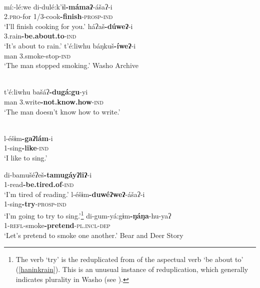 \documentclass[output=paper]{langscibook}
\begin{document}
\label{haninkaspect}\\
\ex mí:-lé:we di-dulé:k'ɨl\textbf{-mámaʔ}-ášaʔ-i\\
2.{\scshape pro}-for 1/3-cook\textbf{-finish}-{\scshape prosp-ind}\\
\glt `I'll finish cooking for you.' 
\ex \gll háʔaš\textbf{-dúweʔ}-i\\
3.rain\textbf{-be.about.to}-{\scshape ind}\\
\glt `It's about to rain.'\label{haninkrain}
\ex \gll\label{haninksmoke} t'é:liwhu báŋkuš\textbf{-íweʔ}-i\\
{} man 3.smoke-stop-{\scshape ind}\\
\glt `The man stopped smoking.' \hfill Washo Archive
\z
\z



 \\
{\gll t'é:liwhu bašáʔ\textbf{-dugá:gu}-yi\\
 man 3.write\textbf{-not.know.how}-{\scshape ind}\\
\glt `The man doesn't know how to write.'} \label{haninkmodal}
\z 


\label{haninkwant}\\
\ex  \gll l-éšɨm\textbf{-gaʔlám}-i\\
1-sing\textbf{-like}-{\scshape ind}\\
\glt `I like to sing.'
\z 
\z 

\label{haninkother} 
\ea \gll di-bamušéʔeš\textbf{-tamugáyʔliʔ}-i\\
1-read\textbf{-be.tired.of}-{\scshape ind}\\
\glt `I'm tired of reading.'
\ex \gll l-éšɨm\textbf{-duwéʔweʔ}-ášaʔ-i\\
1-sing\textbf{-try}-{\scshape prosp-ind}\\
\glt `I'm going to try to sing.'\footnote{The verb `try' is the reduplicated from of the aspectual verb `be about to' (\ref{haninkrain}). This is an unusual instance of reduplication, which generally indicates plurality in Washo (see \citealt{yu2005,yu2012}).}
\ex \gll di-gum-yá:gɨm\textbf{-ŋáŋa}-hu-yaʔ\\
1-{\scshape refl}-smoke\textbf{-pretend}-{\scshape pl.incl-dep}\\
\glt `Let's pretend to smoke one another.' \hfill Bear and Deer Story
\z 
\z 
\end{document}
